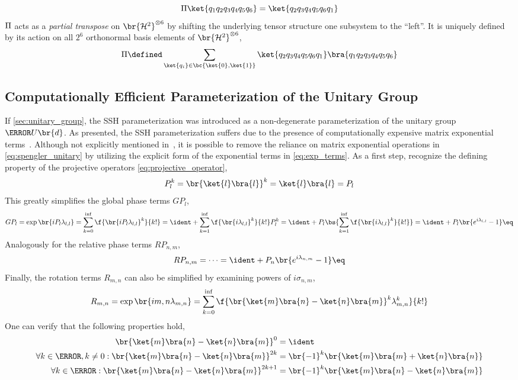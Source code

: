 \documentclass[aps, 10pt, english, twoside, pra, nofootinbib, tightenlines, longbibliography, superscriptaddress]{revtex4-1}
\begin{document}
    \[ \netperm\ket{q_1q_2q_3q_4q_5q_6} = \ket{q_2q_3q_4q_5q_6q_1} \]
    $\Pi$ acts as a \textit{partial transpose} on $\br{\Hilb^2}^{\otimes 6}$ by shifting the underlying tensor structure one subsystem to the ``left''. It is uniquely defined by its action on all $2^6$ orthonormal basis elements of $\br{\Hilb^2}^{\otimes 6}$,
    \[ \netperm \defined \sum_{\ket{q_i} \in \bc{\ket{0}, \ket{1}}}\ket{q_2q_3q_4q_5q_6q_1}\bra{q_1q_2q_3q_4q_5q_6} \]
    \subsection{Computationally Efficient Parameterization of the Unitary Group}
    \label{sec:comp_spengler}

    If \cref{sec:unitary_group}, the SSH parameterization was introduced as a non-degenerate parameterization of the unitary group $\s{U}\br{d}$. As presented, the SSH parameterization suffers due to the presence of computationally expensive matrix exponential terms~\cite{Moler_2003}. Although not explicitly mentioned in~\cite{Spengler_2010_Unitary}, it is possible to remove the reliance on matrix exponential operations in \cref{eq:spengler_unitary} by utilizing the explicit form of the exponential terms in \cref{eq:exp_terms}. As a first step, recognize the defining property of the projective operators \cref{eq:projective_operator},
    \[ P_l^k = \br{\ket{l}\bra{l}}^k = \ket{l}\bra{l} = P_l \]
    This greatly simplifies the global phase terms $GP_l$,
    \[ GP_l = \exp\br{iP_l \lambda_{l,l}} = \sum_{k=0}^{\inf} \f{\br{iP_l \lambda_{l,l}}^k}{k!} = \ident + \sum_{k=1}^{\inf} \f{\br{i \lambda_{l,l}}^k}{k!}P_l^k = \ident + P_l \bs{\sum_{k=1}^{\inf} \f{\br{i \lambda_{l,l}}^k}{k!}} = \ident + P_l \br{e^{i \lambda_{l,l}} - 1} \eq \label{eq:unitary_GP} \]
    Analogously for the relative phase terms $RP_{n,m}$,
    \[ RP_{n,m} = \cdots = \ident + P_n \br{e^{i \lambda_{n,m}} - 1} \eq \label{eq:unitary_RP} \]
    Finally, the rotation terms $R_{m,n}$ can also be simplified by examining powers of $i \sigma_{n,m}$,
    \[ R_{m,n} = \exp\br{i \si_{m,n} \lambda_{m,n}} = \sum_{k=0}^{\inf} \f{\br{\ket{m}\bra{n} - \ket{n}\bra{m}}^k \lambda_{m,n}^k}{k!} \]
    One can verify that the following properties hold,
    \begin{align*}
        \br{\ket{m}\bra{n} - \ket{n}\bra{m}}^0 &= \ident \\
        \forall k \in \N, k \neq 0 : \br{\ket{m}\bra{n} - \ket{n}\bra{m}}^{2k} &= \br{-1}^k\br{\ket{m}\bra{m} + \ket{n}\bra{n}} \\
        \forall k \in \N : \br{\ket{m}\bra{n} - \ket{n}\bra{m}}^{2k+1} &= \br{-1}^k\br{\ket{m}\bra{n} - \ket{n}\bra{m}}
    \end{align*}
\end{document}
